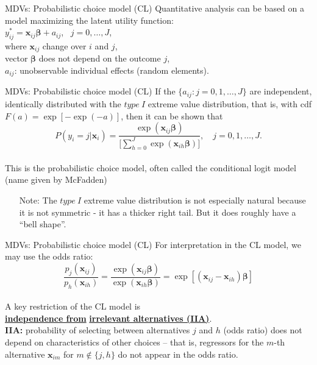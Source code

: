 \documentclass[usenames,dvipsnames]{beamer}
\begin{document}
\begin{frame}{MDVs: Probabilistic choice model (CL)}
Quantitative analysis can be based on a model maximizing the latent utility function: \\
\bigskip
$y_{ij}^{\ast} = \bm{x}_{ij} \bm{\beta} + a_{ij}$, \ $j=0, \dots, J$, \\
\bigskip
where $\bm{x}_{ij}$ change over $i$ and $j$, \\
\medskip
\quad \quad \quad vector $\bm{\beta}$ does not depend on the outcome $j$, \\
\medskip
\quad \quad \quad $a_{ij}$: unobservable individual effects (random elements).
\end{frame}
\begin{frame}{MDVs: Probabilistic choice model (CL)}
If the $\{ a_{ij}: j=0,1,\dots,J \}$ are independent, identically distributed with the $type~I$ extreme value distribution, that is, with cdf $F(a) = \exp[-\exp(-a)]$, then it can be shown that \\
$$ P(y_i = j|\bm{x}_i) = \frac{\exp(\bm{x}_{ij} \bm{\beta})}{\big[\sum_{h=0}^J \exp(\bm{x}_{ih} \bm{\beta}) \big]}, \quad j = 0,1,\dots, J.$$ \\
\medskip
This is the probabilistic choice model, often called the conditional logit model (name given by McFadden) \\
\bigskip
\begin{itemize}
\item[Note:] The $type~I$ extreme value distribution is not especially natural because it is not symmetric - it has a thicker right tail.  But it does roughly have a ``bell shape''.
\end{itemize}
\end{frame}
\begin{frame}{MDVs: Probabilistic choice model (CL)}
For interpretation in the CL model, we may use the odds ratio: \\
$$ \frac{p_j(\bm{x}_{ij})}{p_h(\bm{x}_{ih})} = \frac{\exp(\bm{x}_{ij}\bm{\beta})}{\exp(\bm{x}_{ih}\bm{\beta})} = \exp[(\bm{x}_{ij} - \bm{x}_{ih}) \bm{\beta}] $$ \\
\bigskip
A key restriction of the CL model is\\ \underline{\textbf{independence from}} \underline{\textbf{irrelevant alternatives (IIA)}}.\\
\bigskip
\textbf{IIA:} probability of selecting between alternatives $j$ and $h$ (odds ratio) does not depend on characteristics of other choices – that is, regressors for the $m$-th alternative $\bm{x}_{im}$ for $m \notin \{j,h\}$ do not appear in the odds ratio.
\end{frame}
\end{document}
